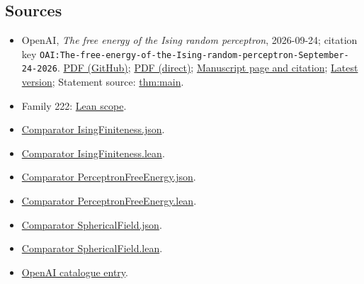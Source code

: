 \documentclass[11pt]{article}
\begin{document}
\subsection{Sources}
\begin{itemize}
\item OpenAI, \emph{The free energy of the Ising random perceptron}, 2026-09-24; citation key \texttt{OAI:The-free-energy-of-the-Ising-random-perceptron-September-24-2026}. \href{https://github.com/openai/math/blob/adc7f1241b42e322a6451854ab7e4b4c146bf78a/preprints/The-free-energy-of-the-Ising-random-perceptron-September-24-2026/The-free-energy-of-the-Ising-random-perceptron-September-24-2026.pdf}{PDF (GitHub)}; \href{https://github.com/openai/math/raw/adc7f1241b42e322a6451854ab7e4b4c146bf78a/preprints/The-free-energy-of-the-Ising-random-perceptron-September-24-2026/The-free-energy-of-the-Ising-random-perceptron-September-24-2026.pdf}{PDF (direct)}; \href{https://github.com/openai/math/blob/adc7f1241b42e322a6451854ab7e4b4c146bf78a/preprints/The-free-energy-of-the-Ising-random-perceptron-September-24-2026/README.md}{Manuscript page and citation}; \href{https://github.com/openai/math/blob/main/preprints/The-free-energy-of-the-Ising-random-perceptron-September-24-2026/The-free-energy-of-the-Ising-random-perceptron-September-24-2026.pdf}{Latest version}; Statement source: \href{https://github.com/openai/math/blob/adc7f1241b42e322a6451854ab7e4b4c146bf78a/preprints/The-free-energy-of-the-Ising-random-perceptron-September-24-2026/build/sections/model.tex\#L88}{thm:main}.
\item Family 222: \href{https://github.com/openai/math/blob/adc7f1241b42e322a6451854ab7e4b4c146bf78a/lean/docs/222.md}{Lean scope}.
\item \href{https://github.com/openai/math/blob/adc7f1241b42e322a6451854ab7e4b4c146bf78a/lean/ComparatorChallenges/IsingFiniteness.json}{Comparator IsingFiniteness.json}.
\item \href{https://github.com/openai/math/blob/adc7f1241b42e322a6451854ab7e4b4c146bf78a/lean/ComparatorChallenges/IsingFiniteness.lean}{Comparator IsingFiniteness.lean}.
\item \href{https://github.com/openai/math/blob/adc7f1241b42e322a6451854ab7e4b4c146bf78a/lean/ComparatorChallenges/PerceptronFreeEnergy.json}{Comparator PerceptronFreeEnergy.json}.
\item \href{https://github.com/openai/math/blob/adc7f1241b42e322a6451854ab7e4b4c146bf78a/lean/ComparatorChallenges/PerceptronFreeEnergy.lean}{Comparator PerceptronFreeEnergy.lean}.
\item \href{https://github.com/openai/math/blob/adc7f1241b42e322a6451854ab7e4b4c146bf78a/lean/ComparatorChallenges/SphericalField.json}{Comparator SphericalField.json}.
\item \href{https://github.com/openai/math/blob/adc7f1241b42e322a6451854ab7e4b4c146bf78a/lean/ComparatorChallenges/SphericalField.lean}{Comparator SphericalField.lean}.
\item \href{https://github.com/openai/math/blob/adc7f1241b42e322a6451854ab7e4b4c146bf78a/CONTENTS.md}{OpenAI catalogue entry}.
\end{itemize}
\end{document}
